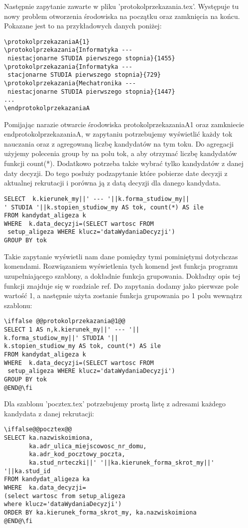 Następnie zapytanie zawarte w pliku 'protokolprzekazania.tex'. Występuje tu nowy problem otworzenia środowiska na początku oraz zamknięcia na końcu. Pokazane jest to na przykładowych danych poniżej:
 \begin{verbatim}
\protokolprzekazaniaA{1}
\protokolprzekazania{Informatyka ---
 niestacjonarne STUDIA pierwszego stopnia}{1455}
\protokolprzekazania{Informatyka ---
 stacjonarne STUDIA pierwszego stopnia}{729}
\protokolprzekazania{Mechatronika ---
 niestacjonarne STUDIA pierwszego stopnia}{1447}
...
\endprotokolprzekazaniaA        
\end{verbatim}
Pomijając narazie otwarcie środowiska protokolprzekazaniaA{1} oraz zamkniecie endprotokolprzekazaniaA, w zapytaniu potrzebujemy wyświetlić każdy tok nauczania oraz z agregowaną liczbę kandydatów na tym toku. Do agregacji użyjemy polecenia group by na polu tok, a aby otrzymać liczbę kandydatów funkcji count(*). Dodatkowo potrzeba także wybrać tylko kandydatów z danej daty decyzji. Do tego posłuży podzapytanie które pobierze date decyzji z aktualnej rekrutacji i porówna ją z datą decyzji dla danego kandydata. 
 \begin{verbatim}
SELECT  k.kierunek_my||' --- '||k.forma_studiow_my||
' STUDIA '||k.stopien_studiow_my AS tok, count(*) AS ile
FROM kandydat_aligeza k
WHERE  k.data_decyzji=(SELECT wartosc FROM
 setup_aligeza WHERE klucz='dataWydaniaDecyzji') 
GROUP BY tok
\end{verbatim}
Takie zapytanie wyświetli nam dane pomiędzy tymi pominiętymi dotychczas komendami. 
Rozwiązaniem wyświetlenia tych komend jest funkcja programu uzupełniającego szablony, a dokładnie funkcja grupowania. Dokładny opis tej funkcji znajduje się w rozdziale ref. Do zapytania dodamy jako pierwsze pole wartość 1, a następnie użyta zostanie funkcja grupowania po 1 polu wewnątrz szablonu:
 \begin{verbatim}
\iffalse @@protokolprzekazania@1@@
SELECT 1 AS n,k.kierunek_my||' --- '||
k.forma_studiow_my||' STUDIA '||
k.stopien_studiow_my AS tok, count(*) AS ile
FROM kandydat_aligeza k
WHERE  k.data_decyzji=(SELECT wartosc FROM
 setup_aligeza WHERE klucz='dataWydaniaDecyzji') 
GROUP BY tok
@END@\fi
\end{verbatim}

Dla szablonu 'pocztex.tex' potrzebujemy prostą listę z adresami każdego kandydata z danej rekrutacji:


 \begin{verbatim}
\iffalse@@pocztex@@
SELECT ka.nazwiskoimiona,
       ka.adr_ulica_miejscowosc_nr_domu,
	   ka.adr_kod_pocztowy_poczta,
	   ka.stud_nrteczki||' '||ka.kierunek_forma_skrot_my||' '||ka.stud_id	   
FROM kandydat_aligeza ka 
WHERE  ka.data_decyzji=
(select wartosc from setup_aligeza 
where klucz='dataWydaniaDecyzji')
ORDER BY ka.kierunek_forma_skrot_my, ka.nazwiskoimiona
@END@\fi
\end{verbatim}

